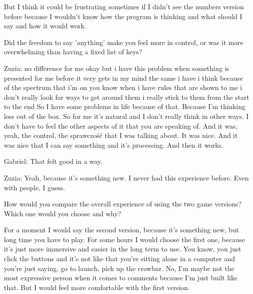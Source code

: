 \begin{QandA}
\begin{answered}
            But I think it could be frustrating sometimes if I didn't see the numbers version before because I wouldn't know how the program is thinking and what should I say and how it would work.
         \end{answered}

    \item Did the freedom to say 'anything' make you feel more in control, or was it more overwhelming than having a fixed list of keys?

         \begin{answered}
            Zuzia: no difference for me okay but i have this problem when something is presented for me before it very gets in my mind the same i have i think because of the spectrum that i'm on you know when i have rules that are shown to me i don't really look for ways to get around them i really stick to them from the start to the end
            So I have some problems in life because of that.
            Because I'm thinking less out of the box.
            So for me it's natural and I don't really think in other ways.
            I don't have to feel the other aspects of it that you are speaking of.
            And it was, yeah, the control, the sprawczość that I was talking about.
            It was nice.
            And it was nice that I can say something and it's processing.
            And then it works.


            Gabriel: That felt good in a way.


            Zuzia: Yeah, because it's something new.
            I never had this experience before.
            Even with people, I guess.
         \end{answered}
    \item How would you compare the overall experience of using the two game versions? Which one would you choose and why?

         \begin{answered}
            For a moment I would say the second version, because it's something new, but long time you have to play.
            For some hours I would choose the first one, because it's just more immersive and easier in the long term to use.
            You know, you just click the buttons and it's not like that you're sitting alone in a computer and you're just saying, go to launch, pick up the crowbar.
            No, I'm maybe not the most expressive person when it comes to comments because I'm just built like that.
            But I would feel more comfortable with the first version.
         \end{answered}
\end{QandA}







